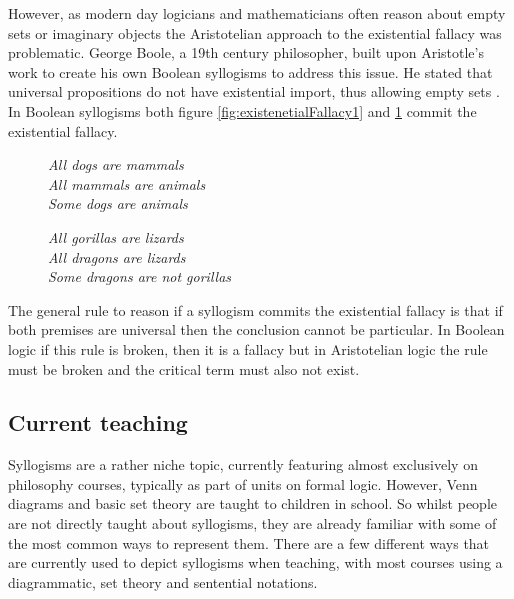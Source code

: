 \documentclass[12pt,a4paper]{report}
\newenvironment{tightcenter}{%
  \setlength\topsep{0pt}
  \setlength\parskip{0pt}
  \begin{center}
}{%
  \end{center}
}
\begin{document}
However, as modern day logicians and mathematicians often reason about empty sets or imaginary objects the Aristotelian approach to the existential fallacy was problematic. George Boole, a 19th century philosopher, built upon Aristotle's work to create his own Boolean syllogisms to address this issue. He stated that universal propositions do not have existential import, thus allowing empty sets \citep{hammerhill}. In Boolean syllogisms both figure \ref{fig:existenetialFallacy1} and \ref{fig:existenetialFallacy2} commit the existential fallacy.


\begin{figure}[!h]
  \centering
  \begin{minipage}[b]{0.4\textwidth}
    \begin{tightcenter}
		\textit{All dogs are mammals }\\ 
		\textit{All mammals are animals}\\
		\textit{Some dogs are animals}\\
		\end{tightcenter}
		    \caption{}
		    \label{fig:existenetialFallacy1}
  \end{minipage}
  \hfill
  \begin{minipage}[b]{0.4\textwidth}
    \begin{tightcenter}
		\textit{All gorillas are lizards }\\ 
		\textit{All dragons are lizards}\\
		\textit{Some dragons are not gorillas}\\
		\end{tightcenter}
				    \caption{}
		    \label{fig:existenetialFallacy2}
  \end{minipage}
\end{figure}
\FloatBarrier

The general rule to reason if a syllogism commits the existential fallacy is that if both premises are universal then the conclusion cannot be particular. In Boolean logic if this rule is broken, then it is a fallacy but in Aristotelian logic the rule must be broken and the critical term must also not exist.

\subsection{Current teaching}
Syllogisms are a rather niche topic, currently featuring almost exclusively on philosophy courses, typically as part of units on formal logic. However, Venn diagrams and basic set theory are taught to children in school. So whilst people are not directly taught about syllogisms, they are already familiar with some of the most common ways to represent them.
There are a few different ways that are currently used to depict syllogisms when teaching, with most courses using a diagrammatic, set theory and sentential notations.
 
\end{document}
